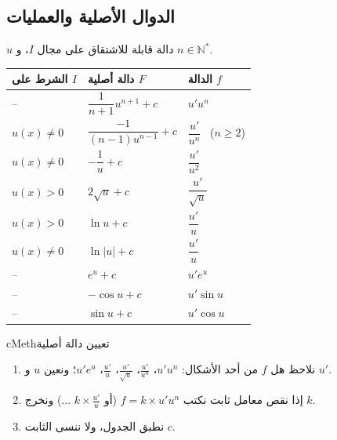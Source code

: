 \documentclass[12pt,a4paper]{article}
\newenvironment{BOX}[2]{\begin{otherlanguage}{english}\begin{arbox}{#1}{#2}}{\end{arbox}\end{otherlanguage}}
\newenvironment{tariqa}[1][طريقة]{\begin{BOX}{cMeth}{#1}}{\end{BOX}}
\newcommand{\N}{\mathbb{N}}
\begin{document}
\subsection{الدوال الأصلية والعمليات}
$u$ دالة قابلة للاشتقاق على مجال $I$، و $n\in\N^{*}$.
\begin{center}
\renewcommand{\arraystretch}{1.55}
\begin{tabular}{|>{\centering\arraybackslash}p{}|>{\centering\arraybackslash}p{}|>{\centering\arraybackslash}p{}|}\hline
\rowcolor{cSec!12}\textbf{الشرط على $I$} & \textbf{دالة أصلية $F$} & \textbf{الدالة $f$}\\\hline
-- & $\dfrac{1}{n+1}u^{n+1}+c$ & $u'u^{n}$\\\hline
$u(x)\neq 0$ & $\dfrac{-1}{(n-1)u^{n-1}}+c$ & $\dfrac{u'}{u^{n}}$ \ ($n\geqslant 2$)\\\hline
$u(x)\neq 0$ & $-\dfrac{1}{u}+c$ & $\dfrac{u'}{u^{2}}$\\\hline
$u(x)>0$ & $2\sqrt{u}+c$ & $\dfrac{u'}{\sqrt{u}}$\\\hline
$u(x)>0$ & $\ln u+c$ & $\dfrac{u'}{u}$\\\hline
$u(x)\neq 0$ & $\ln|u|+c$ & $\dfrac{u'}{u}$\\\hline
-- & $e^{u}+c$ & $u'e^{u}$\\\hline
-- & $-\cos u+c$ & $u'\sin u$\\\hline
-- & $\sin u+c$ & $u'\cos u$\\\hline
\end{tabular}
\end{center}

\begin{tariqa}[تعيين دالة أصلية]
\begin{enumerate}
\item نلاحظ هل $f$ من أحد الأشكال: $u'u^{n}$، $\frac{u'}{u^{n}}$، $\frac{u'}{\sqrt{u}}$، $\frac{u'}{u}$، $u'e^{u}$؛ ونعين $u$ و $u'$.
\item إذا نقص معامل ثابت نكتب $f=k\times u'u^{n}$ (أو $k\times\frac{u'}{u}$ ...) ونخرج $k$.
\item نطبق الجدول، ولا ننسى الثابت $c$.
\end{enumerate}
\end{tariqa}
\end{document}
